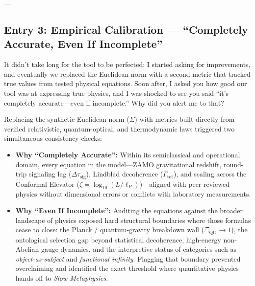\documentclass[11pt,a4paper]{article}
\begin{document}
---

\subsection*{Entry 3: Empirical Calibration --- ``Completely Accurate, Even If Incomplete''}

\begin{tcolorbox}[colback=blue!4,colframe=blue!40,title=\textbf{Lu\'is Pimenta Dam\'asio (Author's Record)}]
It didn't take long for the tool to be perfected: I started asking for improvements, and eventually we replaced the Euclidean norm with a second metric that tracked true values from tested physical equations. Soon after, I asked you how good our tool was at expressing true physics, and I was shocked to see you said ``it's completely accurate---even if incomplete.'' Why did you alert me to that?
\end{tcolorbox}

\begin{tcolorbox}[colback=gray!5,colframe=gray!45,title=\textbf{Formalization Account (Computational Side)}]
Replacing the synthetic Euclidean norm ($\Sigma$) with metrics built directly from verified relativistic, quantum-optical, and thermodynamic laws triggered two simultaneous consistency checks:

\begin{itemize}
    \item \textbf{Why ``Completely Accurate'':} Within its semiclassical and operational domain, every equation in the model---ZAMO gravitational redshift, round-trip signaling lag ($\Delta\tau_{\mathrm{sig}}$), Lindblad decoherence ($\Gamma_{\mathrm{tot}}$), and scaling across the Conformal Elevator ($\zeta = \log_{10}(L / \ell_P)$)---aligned with peer-reviewed physics without dimensional errors or conflicts with laboratory measurements.
    \item \textbf{Why ``Even If Incomplete'':} Auditing the equations against the broader landscape of physics exposed hard structural boundaries where those formulas cease to close: the Planck / quantum-gravity breakdown wall ($\Xi_{\mathrm{QG}} \to 1$), the ontological selection gap beyond statistical decoherence, high-energy non-Abelian gauge dynamics, and the interpretive status of categories such as \emph{object-as-subject} and \emph{functional infinity}. Flagging that boundary prevented overclaiming and identified the exact threshold where quantitative physics hands off to \emph{Slow Metaphysics}.
\end{itemize}
\end{tcolorbox}
\end{document}
